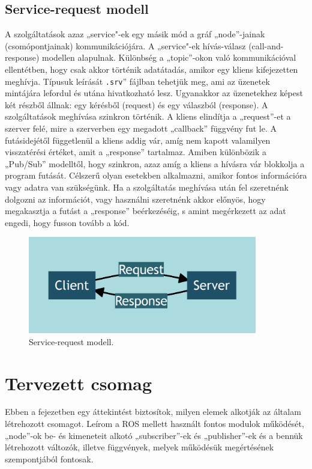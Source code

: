 \subsection{Service-request modell}
\label{sec:ros_s2}
A szolgáltatások azaz „service"-ek egy másik mód a gráf „node”-jainak (csomópontjainak) kommunikációjára. A „service"-ek hívás-válasz (call-and-response) modellen alapulnak. Különbség a „topic”-okon való kommunikációval ellentétben, hogy csak akkor történik adatátadás, amikor egy kliens kifejezetten meghívja. Típusuk leírását \verb|.srv|” fájlban tehetjük meg, ami az üzenetek mintájára lefordul és utána hivatkozható lesz. Ugyanakkor az üzenetekhez képest két részből állnak: egy kérésből (request) és egy válaszból (response). A szolgáltatások meghívása szinkron történik. A kliens elindítja a „request”-et a szerver felé, mire a szerverben egy megadott „callback” függvény fut le. A futásidejétől függetlenül a kliens addig vár, amíg nem kapott valamilyen visszatérési értéket, amit a „response” tartalmaz. Amiben különbözik a „Pub/Sub” modelltől, hogy szinkron, azaz amíg a kliens a hívásra vár blokkolja a program futását. Célszerű olyan esetekben alkalmazni, amikor fontos információra vagy adatra van szükségünk. Ha a szolgáltatás meghívása után fel szeretnénk dolgozni az információt, vagy használni szeretnénk akkor előnyös, hogy megakasztja a futást a „response” beérkezéséig, s amint megérkezett az adat engedi, hogy fusson tovább a kód.
\begin{figure}[!ht]
    \centering
    \includegraphics[width=100mm, keepaspectratio]{02_mermaid/mermaid03_service.png}
    \caption{Service-request modell.}
    \label{fig:service}
\end{figure}


\clearpage
\section{Tervezett csomag}
Ebben a fejezetben egy áttekintést biztosítok, milyen elemek alkotják az általam létrehozott csomagot. Leírom a ROS mellett használt fontos modulok működését, „node”-ok be- és kimeneteit alkotó „subscriber”-ek és „publisher”-ek és a bennük létrehozott változók, illetve függvények, melyek működésük megértésének szempontjából fontosak.

